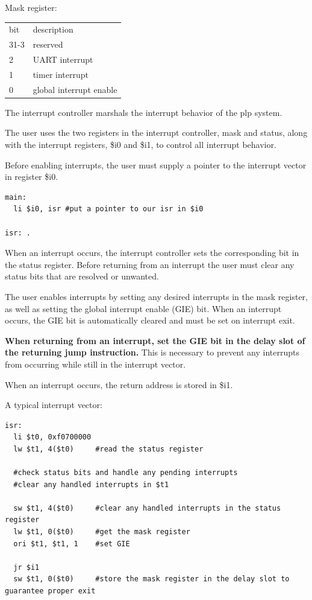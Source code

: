 \documentclass{article}
\begin{document}
Mask register: 

\begin{tabular}{ | l | l | }
\hline
bit & description \\
31-3 & reserved \\
2 & UART interrupt \\
1 & timer interrupt \\
0 & global interrupt enable \\
\hline
\end{tabular}

The interrupt controller marshals the interrupt behavior of the plp system.

The user uses the two registers in the interrupt controller, mask and status, along with the interrupt registers, \$i0 and \$i1, to control all interrupt behavior.

Before enabling interrupts, the user must supply a pointer to the interrupt vector in register \$i0. 

\begin{verbatim}
main:
  li $i0, isr #put a pointer to our isr in $i0

isr: .
\end{verbatim}
When an interrupt occurs, the interrupt controller sets the corresponding bit in the status register. Before returning from an interrupt the user must clear any status bits that are resolved or unwanted.

The user enables interrupts by setting any desired interrupts in the mask register, as well as setting the global interrupt enable (GIE) bit. When an interrupt occurs, the GIE bit is automatically cleared and must be set on interrupt exit.

\textbf{When returning from an interrupt, set the GIE bit in the delay slot of the returning jump instruction.} This is necessary to prevent any interrupts from occurring while still in the interrupt vector.

When an interrupt occurs, the return address is stored in \$i1.

A typical interrupt vector: 
\begin{verbatim}
isr:
  li $t0, 0xf0700000
  lw $t1, 4($t0)     #read the status register
  
  #check status bits and handle any pending interrupts
  #clear any handled interrupts in $t1

  sw $t1, 4($t0)     #clear any handled interrupts in the status register
  lw $t1, 0($t0)     #get the mask register
  ori $t1, $t1, 1    #set GIE

  jr $i1
  sw $t1, 0($t0)     #store the mask register in the delay slot to guarantee proper exit
\end{verbatim}
\end{document}
